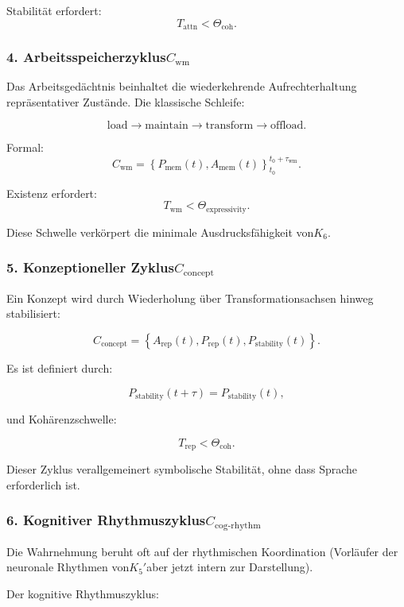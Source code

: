 Stabilität erfordert:
\[
  T_{\mathrm{attn}} < \Theta_{\mathrm{coh}}.
\]

\subsubsection{4. Arbeitsspeicherzyklus$C_{\mathrm{wm}}$}

Das Arbeitsgedächtnis beinhaltet die wiederkehrende Aufrechterhaltung repräsentativer Zustände.
Die klassische Schleife:

\[
 \mathrm{load}
 \to
 \mathrm{maintain}
 \to
 \mathrm{transform}
 \to
 \mathrm{offload}.
\]

Formal:
\[
 C_{\mathrm{wm}} = 
 \left\{
   P_{\mathrm{mem}}(t), A_{\mathrm{mem}}(t)
 \right\}_{t_0}^{t_0+\tau_{\mathrm{wm}}}.
\]

Existenz erfordert:
\[
 T_{\mathrm{wm}} < \Theta_{\mathrm{expressivity}}.
\]

Diese Schwelle verkörpert die minimale Ausdrucksfähigkeit von$K_6$.

\subsubsection{5. Konzeptioneller Zyklus$C_{\mathrm{concept}}$}

Ein Konzept wird durch Wiederholung über Transformationsachsen hinweg stabilisiert:

\[
  C_{\mathrm{concept}}
    = \left\{
      A_{\mathrm{rep}}(t),
      P_{\mathrm{rep}}(t),
      P_{\mathrm{stability}}(t)
    \right\}.
\]

Es ist definiert durch:

\[
  P_{\mathrm{stability}}(t+\tau) = P_{\mathrm{stability}}(t),
\]

und Kohärenzschwelle:

\[
  T_{\mathrm{rep}} < \Theta_{\mathrm{coh}}.
\]

Dieser Zyklus verallgemeinert symbolische Stabilität, ohne dass Sprache erforderlich ist.

\subsubsection{6. Kognitiver Rhythmuszyklus$C_{\mathrm{cog\text{-}rhythm}}$}

Die Wahrnehmung beruht oft auf der rhythmischen Koordination (Vorläufer der
neuronale Rhythmen von$K_5'$aber jetzt intern zur Darstellung).

Der kognitive Rhythmuszyklus:

